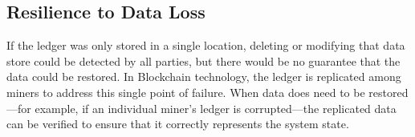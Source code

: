 
\subsection{Resilience to Data Loss}
If the ledger was only stored in a single location, deleting or modifying that data store could be detected by all parties, but there would be no guarantee that the data could be restored.
In Blockchain technology, the ledger is replicated among miners to address this single point of failure.
When data does need to be restored---for example, if an individual miner's 
ledger is corrupted---the replicated data can be verified to ensure that it 
correctly represents the system state.



